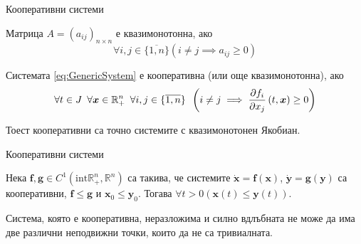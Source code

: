 \begin{frame}[t]{Кооперативни системи}
  \begin{definition}
    Матрица $A=(a_{ij})_{n \times n}$ е квазимонотонна, ако
    \begin{equation*}
      \forall{i,j \in \{\overline{1,n}\}} \left(i \neq j \implies a_{ij} \geq 0\right)
    \end{equation*}
  \end{definition}
  
  \begin{definition}
    \label{def:Cooperative}
    Системата \ref{eq:GenericSystem} е кооперативна (или още квазимонотонна), ако
    \begin{equation}
      \forall{t \in J} \hspace{0.5em} \forall{\boldsymbol{x} \in \mathbb{R}_{+}^n} \hspace{0.5em} \forall{i,j \in \{\overline{1,n}\}} \hspace{0.5em} \left(i \neq j \implies \pdv{f_i}{x_j}\left(t, \boldsymbol{x}\right) \geq 0\right)
    \end{equation}
  \end{definition}

Тоест кооперативни са точно системите с квазимонотонен Якобиан.

\end{frame}

\begin{frame}[t]{Кооперативни системи}
  \begin{theorem}
    \label{thm:Comparison}
    Нека $\boldsymbol{f}, \boldsymbol{g} \in C^1(\mathrm{int} \mathbb{R}_{+}^n, \mathbb{R}^n)$ са такива, че системите $\dot{\boldsymbol{x}}=\boldsymbol{f}(\boldsymbol{x})$, $\dot{\boldsymbol{y}}=\boldsymbol{g}(\boldsymbol{y})$ са кооперативни, $\boldsymbol{f} \leq \boldsymbol{g}$ и $\boldsymbol{x}_0 \leq \boldsymbol{y}_0$. Тогава $\forall{t>0}(\boldsymbol{x}(t) \leq \boldsymbol{y}(t))$.
  \end{theorem}

  \begin{theorem}
    Система, която е кооперативна, неразложима и силно вдлъбната не може да има две различни неподвижни точки, които да не са тривиалната.
  \end{theorem}
\end{frame}
